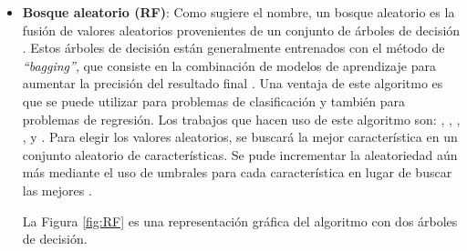 \begin{itemize}
En la Figura \ref{fig:tree} se puede ver un ejemplo de un árbol de decisión sobre préstamos.

\begin{figure}[h!]
\begin{center}
{}
\end{center}
\caption{Representación gráfica de un árbol de decisión.}
\label{fig:tree}
\end{figure}

\newpage

\item \textbf{Bosque aleatorio (\gls{RF})}: Como sugiere el nombre, un bosque aleatorio es la fusión de valores aleatorios provenientes de un conjunto de árboles de decisión \cite{138}. Estos árboles de decisión están generalmente entrenados con el método de \textit{``bagging''}, que consiste en la combinación de modelos de aprendizaje para aumentar la precisión del resultado final \cite{140}. Una ventaja de este algoritmo es que se puede utilizar para problemas de clasificación y también para problemas de regresión. Los trabajos que hacen uso de este algoritmo son: \cite{flow}, \cite{traffic}, \cite{sdn}, \cite{rwguard}, \cite{detecting} y \cite{Kok2020}.
Para elegir los valores aleatorios, se buscará la mejor característica en un conjunto aleatorio de características. Se pude incrementar la aleatoriedad aún más mediante el uso de umbrales para cada característica en lugar de buscar las mejores \cite{139}.

La Figura \ref{fig:RF} es una representación gráfica del algoritmo con dos árboles de decisión.


\end{itemize}
